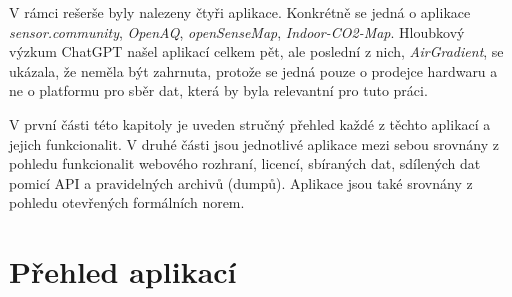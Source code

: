 V rámci rešerše byly nalezeny čtyři aplikace. Konkrétně se jedná o aplikace \textit{sensor.community}, \textit{OpenAQ}, \textit{openSenseMap}, \textit{Indoor-CO2-Map}. Hloubkový výzkum ChatGPT našel aplikací celkem pět, ale poslední z nich, \textit{AirGradient},  se ukázala, že neměla být zahrnuta, protože se jedná pouze o prodejce hardwaru a ne o platformu pro sběr dat, která by byla relevantní pro tuto práci.

V první části této kapitoly je uveden stručný přehled každé z těchto aplikací a jejich funkcionalit.
V druhé části jsou jednotlivé aplikace mezi sebou srovnány z pohledu funkcionalit webového rozhraní, licencí, sbíraných dat, sdílených dat pomicí API a pravidelných archivů (dumpů). Aplikace jsou také srovnány z pohledu otevřených formálních norem.

\FloatBarrier
\section{Přehled aplikací}












